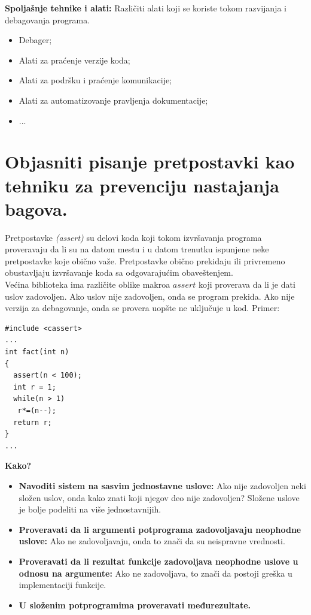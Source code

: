 \documentclass[a4paper]{article}
\begin{document}
  \indent \textbf{Spoljašnje tehnike i alati:} Različiti alati koji se koriste tokom razvijanja
  i debagovanja programa.
  \begin{itemize}
    \item Debager;
    \item Alati za praćenje verzije koda;
    \item Alati za podršku i praćenje komunikacije;
    \item Alati za automatizovanje pravljenja dokumentacije;
    \item ...
  \end{itemize}

\section{Objasniti pisanje pretpostavki kao tehniku za prevenciju nastajanja bagova.}
  Pretpostavke \textit{(assert)} su delovi koda koji tokom izvršavanja programa proveravaju da li su
  na datom mestu i u datom trenutku ispunjene neke pretpostavke koje obično važe. Pretpostavke 
  obično prekidaju ili privremeno obustavljaju izvršavanje koda sa odgovarajućim obaveštenjem.\\
  \indent Većina biblioteka ima različite oblike makroa $assert$ koji proverava da li je dati
  uslov zadovoljen. Ako uslov nije zadovoljen, onda se program prekida. Ako nije verzija za
  debagovanje, onda se provera uopšte ne uključuje u kod. Primer:
\begin{lstlisting}
#include <cassert>
...
int fact(int n)
{
  assert(n < 100);
  int r = 1;
  while(n > 1)
   r*=(n--);
  return r;
}
...
\end{lstlisting}
  \textbf{Kako?}
  \begin{itemize}
    \item \textbf{Navoditi sistem na sasvim jednostavne uslove:} Ako nije zadovoljen neki složen uslov,
          onda kako znati koji njegov deo nije zadovoljen? Složene uslove je bolje podeliti
          na više jednostavnijih.
    \item \textbf{Proveravati da li argumenti potprograma zadovoljavaju neophodne uslove:} 
          Ako ne zadovoljavaju, onda to znači da su neispravne vrednosti.
    \item \textbf{Proveravati da li rezultat funkcije zadovoljava neophodne uslove u odnosu na 
          argumente:} Ako ne zadovoljava, to znači da postoji greška u implementaciji funkcije.
      \item \textbf{U složenim potprogramima proveravati međurezultate.}
  \end{itemize}
\end{document}
